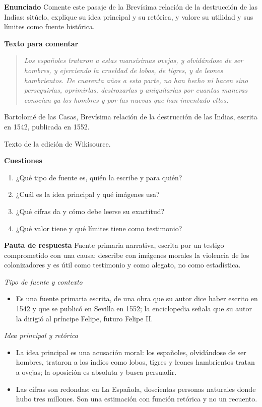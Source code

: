 \documentclass{book}
\begin{document}
\begin{tcolorbox}[title={Ejercicio resuelto}, studiumworked, breakable]

\noindent\textbf{Enunciado}
Comente este pasaje de la Brevísima relación de la destrucción de las Indias: sitúelo, explique su idea principal y su retórica, y valore su utilidad y sus límites como fuente histórica.


\noindent\textbf{Texto para comentar}

\begin{quote}
\itshape Los españoles trataron a estas mansísimas ovejas, y olvidándose de ser hombres, y ejerciendo la crueldad de lobos, de tigres, y de leones hambrientos. De cuarenta años a esta parte, no han hecho ni hacen sino perseguirlas, oprimirlas, destrozarlas y aniquilarlas por cuantas maneras conocían ya los hombres y por las nuevas que han inventado ellos.
\end{quote}
{\noindent\footnotesize Bartolomé de las Casas, Brevísima relación de la destrucción de las Indias, escrita en 1542, publicada en 1552.\par}
{\noindent\footnotesize Texto de la edición de Wikisource.\par}

\noindent\textbf{Cuestiones}
\begin{enumerate}
\item ¿Qué tipo de fuente es, quién la escribe y para quién?
\item ¿Cuál es la idea principal y qué imágenes usa?
\item ¿Qué cifras da y cómo debe leerse su exactitud?
\item ¿Qué valor tiene y qué límites tiene como testimonio?
\end{enumerate}

\noindent\textbf{Pauta de respuesta}
Fuente primaria narrativa, escrita por un testigo comprometido con una causa: describe con imágenes morales la violencia de los colonizadores y es útil como testimonio y como alegato, no como estadística.


\noindent\textit{Tipo de fuente y contexto}
\begin{itemize}
\item Es una fuente primaria escrita, de una obra que su autor dice haber escrito en 1542 y que se publicó en Sevilla en 1552; la enciclopedia señala que su autor la dirigió al príncipe Felipe, futuro Felipe II.
\end{itemize}

\noindent\textit{Idea principal y retórica}
\begin{itemize}
\item La idea principal es una acusación moral: los españoles, olvidándose de ser hombres, trataron a los indios como lobos, tigres y leones hambrientos tratan a ovejas; la oposición es absoluta y busca persuadir.
\item Las cifras son redondas: en La Española, doscientas personas naturales donde hubo tres millones. Son una estimación con función retórica y no un recuento.
\end{itemize}


\end{tcolorbox}
\end{document}
